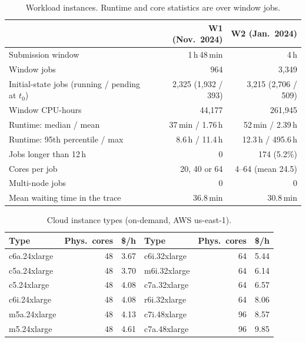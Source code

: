 \documentclass[conference]{IEEEtran}
\begin{document}
\begin{table}[t]
  \centering
  \caption{Workload instances. Runtime and core statistics are over window jobs.}
  \label{tab:workloads}
  \begin{tabular}{lrr}
    \toprule
                                        & W1 (Nov.~2024) & W2 (Jan.~2024) \\
    \midrule
    Submission window                   & 1\,h\,48\,min & 4\,h \\
    Window jobs                         & 964        & 3{,}349 \\
    Initial-state jobs (running / pending at $t_0$) & 2{,}325 (1{,}932 / 393) & 3{,}215 (2{,}706 / 509) \\
    Window CPU-hours                    & 44{,}177   & 261{,}945 \\
    Runtime: median / mean              & 37\,min / 1.76\,h & 52\,min / 2.39\,h \\
    Runtime: 95th percentile / max      & 8.6\,h / 11.4\,h  & 12.3\,h / 495.6\,h \\
    Jobs longer than 12\,h              & 0          & 174 (5.2\%) \\
    Cores per job                       & 20, 40 or 64 & 4--64 (mean 24.5) \\
    Multi-node jobs                     & 0          & 0 \\
    Mean waiting time in the trace      & 36.8\,min  & 30.8\,min \\
    \bottomrule
  \end{tabular}
\end{table}

\begin{table}[t]
  \centering
  \caption{Cloud instance types (on-demand, AWS us-east-1).}
  \label{tab:cloud}
  \begin{tabular}{lrr@{\qquad}lrr}
    \toprule
    Type & Phys.\ cores & \$/h & Type & Phys.\ cores & \$/h \\
    \midrule
    c6a.24xlarge & 48 & 3.67 & c6i.32xlarge & 64 & 5.44 \\
    c5a.24xlarge & 48 & 3.70 & m6i.32xlarge & 64 & 6.14 \\
    c5.24xlarge  & 48 & 4.08 & c7a.32xlarge & 64 & 6.57 \\
    c6i.24xlarge & 48 & 4.08 & r6i.32xlarge & 64 & 8.06 \\
    m5a.24xlarge & 48 & 4.13 & c7i.48xlarge & 96 & 8.57 \\
    m5.24xlarge  & 48 & 4.61 & c7a.48xlarge & 96 & 9.85 \\
    \bottomrule
  \end{tabular}
\end{table}
\end{document}
